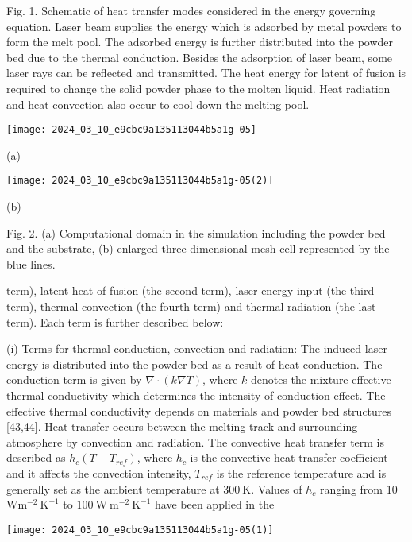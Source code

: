 \documentclass[10pt]{article}
\begin{document}
Fig. 1. Schematic of heat transfer modes considered in the energy governing equation. Laser beam supplies the energy which is adsorbed by metal powders to form the melt pool. The adsorbed energy is further distributed into the powder bed due to the thermal conduction. Besides the adsorption of laser beam, some laser rays can be reflected and transmitted. The heat energy for latent of fusion is required to change the solid powder phase to the molten liquid. Heat radiation and heat convection also occur to cool down the melting pool.

\begin{center}
\texttt{[image: 2024\_03\_10\_e9cbc9a135113044b5a1g-05]}
\end{center}

(a)

\begin{center}
\texttt{[image: 2024\_03\_10\_e9cbc9a135113044b5a1g-05(2)]}
\end{center}

(b)

Fig. 2. (a) Computational domain in the simulation including the powder bed and the substrate, (b) enlarged three-dimensional mesh cell represented by the blue lines.

term), latent heat of fusion (the second term), laser energy input (the third term), thermal convection (the fourth term) and thermal radiation (the last term). Each term is further described below:

(i) Terms for thermal conduction, convection and radiation: The induced laser energy is distributed into the powder bed as a result of heat conduction. The conduction term is given by $\nabla \cdot(k \nabla T)$, where $k$ denotes the mixture effective thermal conductivity which determines the intensity of conduction effect. The effective thermal conductivity depends on materials and powder bed structures [43,44]. Heat transfer occurs between the melting track and surrounding atmosphere by convection and radiation. The convective heat transfer term is described as $h_{c}\left(T-T_{r e f}\right)$, where $h_{c}$ is the convective heat transfer coefficient and it affects the convection intensity, $T_{r e f}$ is the reference temperature and is generally set as the ambient temperature at $300 \mathrm{~K}$. Values of $h_{c}$ ranging from 10 $\mathrm{W} \mathrm{m}^{-2} \mathrm{~K}^{-1}$ to $100 \mathrm{~W} \mathrm{~m}^{-2} \mathrm{~K}^{-1}$ have been applied in the

\begin{center}
\texttt{[image: 2024\_03\_10\_e9cbc9a135113044b5a1g-05(1)]}
\end{center}
\end{document}
